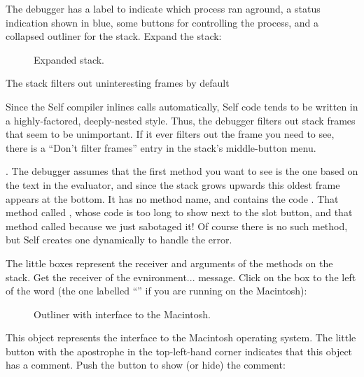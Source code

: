 \documentclass[letterpaper,10pt,english]{sphinxmanual}
\begin{document}
The debugger has a label to indicate which process ran aground, a status indication shown in blue,
some buttons for controlling the process, and a collapsed outliner for the stack. Expand the stack:
\begin{figure}[htbp]
\centering
\capstart

\noindent{}
\caption{Expanded stack.}\label{\detokenize{howtoprg:id13}}\end{figure}

The stack filters out uninteresting frames by default %
\begin{footnote}[6]\sphinxAtStartFootnote
Since the Self compiler inlines calls automatically, Self code tends to be written in a highly-factored, deeply-nested style. Thus, the debugger filters out stack frames that seem to be unimportant. If it ever filters out the frame you need to see, there is a “Don’t filter frames” entry in the stack’s middle-button menu.
%
\end{footnote}. The debugger assumes that the first method
you want to see is the one based on the text in the evaluator, and since the stack grows upwards this
oldest frame appears at the bottom. It has no method name, and contains the code . That
method called , whose code is too long to show next to the slot button, and that method
called  because we just sabotaged it! Of course there is no such method,
but Self creates one dynamically to handle the error.

The little boxes represent the receiver and arguments of the methods on the stack. Get the receiver
of the evnironment... message. Click on the box to the left of the word 
(the one labelled “” if you are running on the Macintosh):
\begin{figure}[htbp]
\centering
\capstart

\noindent{}
\caption{Outliner with interface to the Macintosh.}\label{\detokenize{howtoprg:id14}}\end{figure}

This object represents the interface to the Macintosh operating system. The little button with the
apostrophe in the top-left-hand corner indicates that this object has a comment. Push the button to
show (or hide) the comment:
\begin{figure}[htbp]
\centering

\noindent{}
\end{figure}
\end{document}
